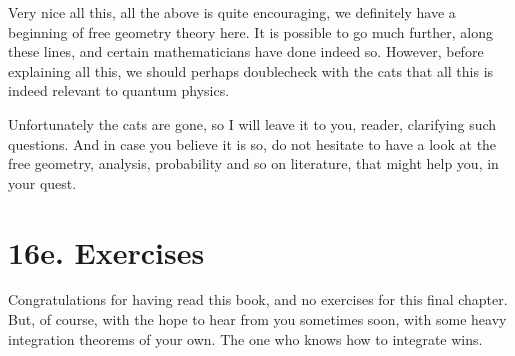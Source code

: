 \documentclass[12pt]{amsbook}
\begin{document}
Very nice all this, all the above is quite encouraging, we definitely have a beginning of free geometry theory here. It is possible to go much further, along these lines, and certain mathematicians have done indeed so. However, before explaining all this, we should perhaps doublecheck with the cats that all this is indeed relevant to quantum physics.

\bigskip

Unfortunately the cats are gone, so I will leave it to you, reader, clarifying such questions. And in case you believe it is so, do not hesitate to have a look at the free geometry, analysis, probability and so on literature, that might help you, in your quest.

\section*{16e. Exercises}

Congratulations for having read this book, and no exercises for this final chapter. But, of course, with the hope to hear from you sometimes soon, with some heavy integration theorems of your own. The one who knows how to integrate wins.
\end{document}
